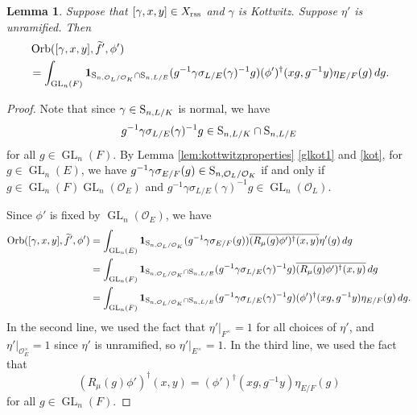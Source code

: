 \documentclass[11pt, reqno]{amsart}
\numberwithin{equation}{subsection}
\theoremstyle{plain}
\newtheorem{lem}[proposition]{Lemma}
\theoremstyle{definition}
\renewcommand{\O}{\mathcal O}
\newcommand{\ol}{\overline}
\renewcommand{\S}{\textnormal{S}}
\DeclareMathOperator{\GL}{GL}
\DeclareMathOperator{\Orb}{Orb}
\newcommand{\rss}{\textnormal{rss}}
\begin{document}
\begin{lem}
\label{lem:GLFLred}
    Suppose that $[\gamma, x, y] \in X_\rss$ and 
    $\gamma$ is Kottwitz.
    Suppose $\eta'$ is unramified. Then
    \begin{align*}
        &\Orb([\gamma, x, y], \widetilde f', \phi')\\
        &= 
        \int_{\GL_n(F)}
        \mathbf{1}_{\S_{n, \O_L/\O_K} \cap \S_{n, L/E}}
        (g^{-1}\gamma\sigma_{L/E}(\gamma)^{-1} g)
        (\phi')^\dagger(xg, g^{-1}y)\eta_{E/F}(g)\,dg.
    \end{align*}
\end{lem}
\begin{proof}
Note that since $\gamma \in \S_{n,L/K}$ is normal, we have
\[
    g^{-1}\gamma\sigma_{L/E}(\gamma)^{-1} g \in
    \S_{n,L/K} \cap \S_{n, L/E}
\]
for all $g \in \GL_n(F)$.
By Lemma \ref{lem:kottwitzproperties} \eqref{glkot1}
and \eqref{kot}, for $g \in \GL_n(E)$, we have 
$g^{-1}\gamma\sigma_{E/F}(g) \in \S_{n, \O_L/\O_K}$
if and only if $g \in \GL_n(F)\GL_n(\O_E)$
and $g^{-1}\gamma\sigma_{L/E}(\gamma)^{-1} g
\in \GL_n(\O_L)$.

Since $\phi'$ is fixed by $\GL_n(\O_E)$, we have
\begin{align*}
    \Orb([\gamma, x, y], \widetilde f', \phi')
    &= \int_{\GL_n(E)} \mathbf{1}_{\S_{n, \O_L/\O_K}}
    (g^{-1}\gamma \sigma_{E/F}(g)) \ol{(R_{\mu}(g)\phi')^\dagger(x, y)}
    \eta'(g)\, dg \\
    &= \int_{\GL_n(F)} \mathbf{1}_{\S_{n, \O_L/\O_K} \cap \S_{n, L/E}}
    (g^{-1} \gamma\sigma_{L/E}(\gamma)^{-1} g)
    \ol{(R_\mu(g)\phi')^\dagger(x, y)}\, dg \\
    &= \int_{\GL_n(F)} \mathbf{1}_{\S_{n, \O_L/\O_K} \cap
    \S_{n, L/E}}
    (g^{-1}\gamma\sigma_{L/E}(\gamma)^{-1} g)
    (\phi')^\dagger(xg, g^{-1} y) \eta_{E/F}(g) \,dg.
\end{align*}
In the second line, we used the fact that
$\eta'|_{F^\times} = 1$ for all choices of $\eta'$,
and $\eta'|_{\O_E^\times} = 1$
since $\eta'$ is unramified, so $\eta'|_{E^\times} = 1$.
In the third line, we used the fact that
\[
    (R_\mu(g)\phi')^\dagger(x, y) = (\phi')^\dagger(xg,
    g^{-1}y)\eta_{E/F}(g)
\]
for all $g \in \GL_n(F)$.
\end{proof}
\end{document}

